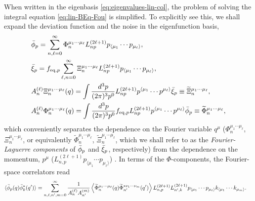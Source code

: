 \documentclass[aps,prd,preprint,nofootinbib,amsmath,amssymb,showpacs,longbibliography,singlecolumn,superscriptaddress,10pt]{revtex4-1}
\theoremstyle{plain}
\theoremstyle{definition}
\begin{document}
When written in the eigenbasis \eqref{eq:eigenvalues-lin-col}, the problem of solving the integral equation \eqref{eq:lin-BEq-Fou} is simplified. To explicitly see this, we shall expand the deviation function and the noise in the eigenfunction basis, 
%
\begin{subequations}
\label{eq:phi-xi-expn}
\begin{align}
&
\label{eq:phi-xi-expn-1}
 \Bar{\phi}_p = \sum_{n,\ell = 0}^{\infty} \Phi_{n}^{\mu_{1} \cdots \mu_{\ell}} L^{(2 \ell + 1)}_{n p} p_{\langle \mu_{1}} \cdots p_{ \mu_{\ell} \rangle}
, 
\\
&
\label{eq:phi-xi-expn-1b}
\Bar{\xi}_p = f_{\mathrm{eq}, p} \sum_{\ell, n = 0}^{\infty} \Xi_{n}^{\mu_{1} \cdots \mu_{\ell}} L^{(2 \ell + 1)}_{n p} p_{\langle \mu_{1}} \cdots p_{\mu_{\ell} \rangle},
\\
&
\label{eq:phi-xi-expn-2}
A_{n}^{(\ell)}\Xi_{n}^{\mu_{1} \cdots \mu_{\ell}}(q)
=
\int \dfrac{d^3 p}{(2\pi)^3 p^0} L^{(2 \ell + 1)}_{n p} p^{\langle \mu_{1}} \cdots p^{ \mu_{\ell} \rangle} \Bar{\xi}_p
\equiv
\widetilde{\Xi}_{n}^{\mu_{1} \cdots \mu_{\ell}},
\\
&
\label{eq:phi-xi-expn-3}
A_{n}^{(\ell)}\Phi_{n}^{\mu_{1} \cdots \mu_{\ell}}(q)
=
\int \dfrac{d^3 p}{(2\pi)^3 p^0} f_{\mathrm{eq},p}  L^{(2 \ell + 1)}_{n p} p^{\langle \mu_{1}} \cdots p^{ \mu_{\ell} \rangle} \Bar{\phi}_p
\equiv
\widetilde{\Phi}_{n}^{\mu_{1} \cdots \mu_{\ell}},
\end{align}    
\end{subequations}
%
which conveniently separates the dependence on the Fourier variable $q^{\mu}$ ($\Phi_{n}^{\mu_{1} \cdots \mu_{\ell}}$, $\Xi_{n}^{\mu_{1} \cdots \mu_{\ell}}$, or equivalently $\widetilde\Phi_{n}^{\mu_{1} \cdots \mu_{\ell}}$, $\widetilde\Xi_{n}^{\mu_{1} \cdots \mu_{\ell}}$, which we shall refer to as the \textit{Fourier-Laguerre components} of $\Bar{\phi}_{p}$ and $\Bar{\xi}_{p}$, respectively) from the dependence on the momentum, $p^{\mu}$ ($L^{(2 \ell + 1)}_{n, p} p_{\langle \mu_{1}} \cdots p_{ \mu_{\ell} \rangle} $) . In terms of the $\Phi$-components, the Fourier-space correlators read
%
\begin{equation}
\label{eq:phi-phi-correlators}
\begin{aligned}
&
\langle \Bar{\phi}_{p}(q) \Bar{\phi}^{*}_{k}(q')  \rangle 
=
\sum_{n,\ell, n',m = 0}^{\infty} \frac{1}{A_{n}^{(\ell)} A_{n'}^{(m)} } 
\left\langle \widetilde{\Phi}_{n}^{\mu_{1} \cdots \mu_{\ell}}(q) \widetilde{\Phi}_{n'}^{*\nu_{1} \cdots \nu_{m}}(q') \right\rangle
L^{(2 \ell + 1)}_{n, p}
L^{(2 \ell + 1)}_{n', k}
 p_{\langle \mu_{1}} \cdots p_{ \mu_{\ell}
 \rangle}
  k_{\langle \mu_{1}} \cdots k_{ \mu_{m}
 \rangle}.
\end{aligned}    
\end{equation}
\end{document}
